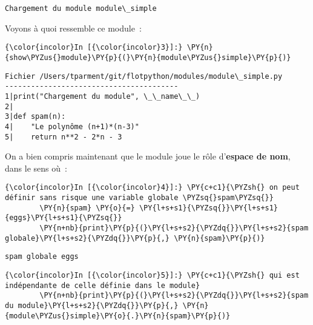     \begin{Verbatim}[commandchars=\\\{\},frame=single,framerule=0.3mm,rulecolor=\color{cellframecolor}]
Chargement du module module\_simple
\end{Verbatim}

    Voyons à quoi ressemble ce module~:

    \begin{Verbatim}[commandchars=\\\{\},frame=single,framerule=0.3mm,rulecolor=\color{cellframecolor}]
{\color{incolor}In [{\color{incolor}3}]:} \PY{n}{show\PYZus{}module}\PY{p}{(}\PY{n}{module\PYZus{}simple}\PY{p}{)}
\end{Verbatim}


    \begin{Verbatim}[commandchars=\\\{\},frame=single,framerule=0.3mm,rulecolor=\color{cellframecolor}]
Fichier /Users/tparment/git/flotpython/modules/module\_simple.py
----------------------------------------
1|print("Chargement du module", \_\_name\_\_)
2|
3|def spam(n):
4|    "Le polynôme (n+1)*(n-3)"
5|    return n**2 - 2*n - 3
\end{Verbatim}

    On a bien compris maintenant que le module joue le rôle d'\textbf{espace
de nom}, dans le sens où~:

    \begin{Verbatim}[commandchars=\\\{\},frame=single,framerule=0.3mm,rulecolor=\color{cellframecolor}]
{\color{incolor}In [{\color{incolor}4}]:} \PY{c+c1}{\PYZsh{} on peut définir sans risque une variable globale \PYZsq{}spam\PYZsq{}}
        \PY{n}{spam} \PY{o}{=} \PY{l+s+s1}{\PYZsq{}}\PY{l+s+s1}{eggs}\PY{l+s+s1}{\PYZsq{}}
        \PY{n+nb}{print}\PY{p}{(}\PY{l+s+s2}{\PYZdq{}}\PY{l+s+s2}{spam globale}\PY{l+s+s2}{\PYZdq{}}\PY{p}{,} \PY{n}{spam}\PY{p}{)}
\end{Verbatim}


    \begin{Verbatim}[commandchars=\\\{\},frame=single,framerule=0.3mm,rulecolor=\color{cellframecolor}]
spam globale eggs
\end{Verbatim}

    \begin{Verbatim}[commandchars=\\\{\},frame=single,framerule=0.3mm,rulecolor=\color{cellframecolor}]
{\color{incolor}In [{\color{incolor}5}]:} \PY{c+c1}{\PYZsh{} qui est indépendante de celle définie dans le module}
        \PY{n+nb}{print}\PY{p}{(}\PY{l+s+s2}{\PYZdq{}}\PY{l+s+s2}{spam du module}\PY{l+s+s2}{\PYZdq{}}\PY{p}{,} \PY{n}{module\PYZus{}simple}\PY{o}{.}\PY{n}{spam}\PY{p}{)}
\end{Verbatim}



